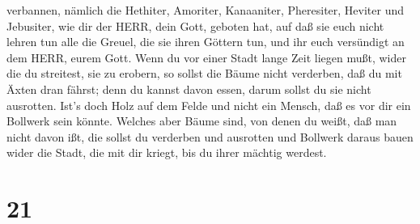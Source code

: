 verbannen, nämlich die Hethiter, Amoriter, Kanaaniter, Pheresiter,
Heviter und Jebusiter, wie dir der HERR, dein Gott, geboten hat,
 auf daß sie euch nicht lehren tun alle die Greuel, die sie
ihren Göttern tun, und ihr euch versündigt an dem HERR, eurem Gott.
 Wenn du vor einer Stadt lange Zeit liegen mußt, wider die
du streitest, sie zu erobern, so sollst die Bäume nicht verderben, daß
du mit Äxten dran fährst; denn du kannst davon essen, darum sollst du
sie nicht ausrotten. Ist's doch Holz auf dem Felde und nicht ein Mensch,
daß es vor dir ein Bollwerk sein könnte.  Welches aber
Bäume sind, von denen du weißt, daß man nicht davon ißt, die sollst du
verderben und ausrotten und Bollwerk daraus bauen wider die Stadt, die
mit dir kriegt, bis du ihrer mächtig werdest.

\hypertarget{section-20}{%
\section{21}\label{section-20}}

